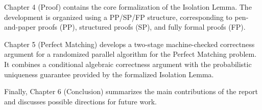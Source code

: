 Chapter 4 (Proof) contains the core formalization of the Isolation Lemma.
The development is organized using a PP/SP/FP structure, corresponding to pen-and-paper proofs (PP), structured proofs (SP), and fully formal proofs (FP).

Chapter 5 (Perfect Matching) develops a two-stage machine-checked correctness argument for a randomized parallel algorithm for the Perfect Matching problem.
It combines a conditional algebraic correctness argument with the probabilistic uniqueness guarantee provided by the formalized Isolation Lemma.

Finally, Chapter 6 (Conclusion) summarizes the main contributions of the report and discusses possible directions for future work.